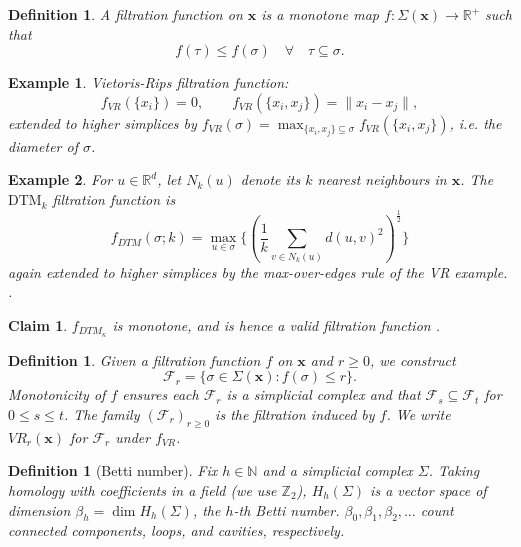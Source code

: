 \documentclass[11pt,letterpaper]{article}
\newcommand{\R}{\mathbb{R}}
\newcommand{\N}{\mathbb{N}}
\newcommand{\Z}{\mathbb{Z}}
\newcommand{\1}{\mathds{1}}
\newcommand{\pc}{\mathbf{x}}
\newcommand{\simpcom}{\Sigma}
\theoremstyle{plain}
\newtheorem{claim}[theorem]{Claim}
\theoremstyle{definitioncolon}
\newtheorem{definition}[theorem]{Definition}
\newtheorem*{example}{Example}
\begin{document}
    \begin{definition}
        A filtration function on $\pc$ is a monotone map
        $f: \Sigma(\pc) \rightarrow \R^+$ such that
            \[
            f(\tau) \leq f(\sigma) \quad \forall \quad \tau \subseteq \sigma.
            \]
    \end{definition}

    \begin{example}
        Vietoris-Rips filtration function:
            \[
            f_{VR}(\{x_i\}) = 0, \qquad f_{VR}(\{x_i, x_j\}) = \|x_i - x_j\|,
            \]
        extended to higher simplices by $f_{VR}(\sigma) = \max_{\{x_i,x_j\}
        \subseteq \sigma} f_{VR}(\{x_i, x_j\})$, i.e. the diameter of $\sigma$.
    \end{example}

    \begin{example}
    \label{ex:dtm}
        For $u \in \R^d$, let $N_k(u)$ denote its $k$ nearest neighbours in
        $\pc$. The $\mathrm{DTM}_k$ filtration function is
            \[
            f_{DTM}(\sigma; k) = \max_{u \in \sigma}\{(\frac{1}{k}
            \sum_{v \in N_k(u)} d(u, v)^2)^{\frac{1}{2}}\}
            \]
        again extended to higher simplices by the max-over-edges rule of the VR
        example. \citep{anai2020dtm}.
    \end{example}

    \begin{claim}
        $f_{DTM_\kappa}$ is monotone, and is hence a valid filtration function
        \citep[Prop.\ 3.5]{anai2020dtm}.
    \end{claim}

    \begin{definition}
        Given a filtration function $f$ on $\pc$ and $r \geq 0$, we construct
            \[
            \mathcal{F}_r = \{\sigma \in \Sigma(\pc) : f(\sigma)
            \leq r\}.
            \]
        Monotonicity of $f$ ensures each $\mathcal{F}_r$ is a simplicial complex
        and that $\mathcal{F}_s \subseteq \mathcal{F}_t$ for $0 \leq s \leq t$.
        The family $(\mathcal{F}_r)_{r \geq 0}$ is the \emph{filtration} induced
        by $f$. We write $VR_r(\pc)$ for $\mathcal{F}_r$ under $f_{VR}$.
    \end{definition}

    \begin{definition}[Betti number]
        Fix $h \in \N$ and a simplicial complex $\Sigma$. Taking homology
        with coefficients in a field (we use $\Z_2$), $H_h(\simpcom)$ is a
        vector space of dimension $\beta_h = \dim H_h(\simpcom)$, the $h$-th
        \emph{Betti number}. $\beta_0, \beta_1, \beta_2, \dots$ count connected
        components, loops, and cavities, respectively.
    \end{definition}
\end{document}
